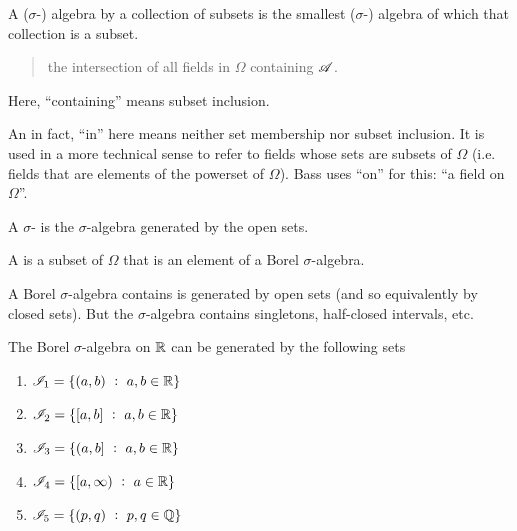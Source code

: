 \begin{definition}
  A ($\sigma$-) algebra  by a collection of subsets is the smallest ($\sigma$-) algebra of which that
  collection is a subset.
\end{definition}


\begin{quote}
  the intersection of all fields in $\Omega$ containing $\mathscr A$.
\end{quote}

Here, ``containing​'' means subset inclusion.

An in fact, ``in​'' here means neither set membership nor subset inclusion. It is used in a more technical sense
to refer to fields whose sets are subsets of $\Omega$ (i.e. fields that are elements of the powerset
of $\Omega$). Bass uses ``on​'' for this: ``a field on $\Omega$​''.

\begin{definition}
  A  $\sigma$- is the $\sigma$-algebra generated by the open sets.

  A  is a subset of $\Omega$ that is an element of a Borel $\sigma$-algebra.
\end{definition}

A Borel $\sigma$-algebra contains is generated by open sets (and so equivalently by closed sets). But
the $\sigma$-algebra contains singletons, half-closed intervals, etc.

\begin{theorem}
  The Borel $\sigma$-algebra on $\mathbb{R}$ can be generated by the following sets
  \begin{enumerate}
  \item $\mathscr I_1 = \{(a, b) ~:~ a, b \in \mathbb{R}\}$
  \item $\mathscr I_2 = \{[a, b] ~:~ a, b \in \mathbb{R}\}$
  \item $\mathscr I_3 = \{(a, b] ~:~ a, b \in \mathbb{R}\}$
  \item $\mathscr I_4 = \{[a, \infty) ~:~ a \in \mathbb{R}\}$
  \item $\mathscr I_5 = \{(p, q) ~:~ p, q \in \mathbb{Q}\}$
  \end{enumerate}
\end{theorem}

